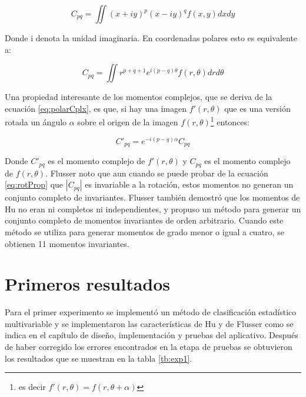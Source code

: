 \documentclass[a4paper, 11pt, oneside]{report}
\begin{document}
	\[ C_{pq} = \iint{ (x+iy)^p (x-iy)^q f(x,y) dx dy } \]
	
Donde i denota la unidad imaginaria. En coordenadas polares esto es equivalente a:

	\begin{equation}\label{eq:polarCplx}
		C_{pq} = \iint{ r^{p+q+1}e^{i(p-q)\theta}f(r,\theta) dr d\theta }
	\end{equation}

Una propiedad interesante de los momentos complejos, que se deriva de la ecuación \ref{eq:polarCplx}, es que, si hay una imagen $f'(r,\theta)$ que es una versión rotada un ángulo $\alpha$ sobre el origen de la imagen $f(r,\theta)$\footnote{es decir $f'(r,\theta) = f(r,\theta+\alpha)$} entonces:

\begin{equation}\label{eq:rotProp}
	C'_{pq} = e^{-i(p-q)\alpha}C_{pq}
\end{equation}

Donde $C'_{pq}$ es el momento complejo de $f'(r,\theta)$ y $C_{pq}$ es el momento complejo de $f(r,\theta)$. Flusser noto \cite{flusser99} que aun cuando se puede probar de la ecuación \ref{eq:rotProp} que $|C_{pq}|$ es invariable a la rotación, estos momentos no generan un conjunto completo de invariantes. Flusser también demostró que los momentos de Hu no eran ni completos ni independientes, y propuso un método para generar un conjunto completo de momentos invariantes de orden arbitrario. Cuando este método se utiliza para generar momentos de grado menor o igual a cuatro, se obtienen 11 momentos invariantes.

\section{Primeros resultados}

Para el primer experimento se implementó un método de clasificación estadístico multivariable y se implementaron las características de Hu y de Flusser como se indica en el capítulo de diseño, implementación y pruebas del aplicativo. Después de haber corregido los errores encontrados en la etapa de pruebas se obtuvieron los resultados que se muestran en la tabla \ref{tb:exp1}.
\end{document}
